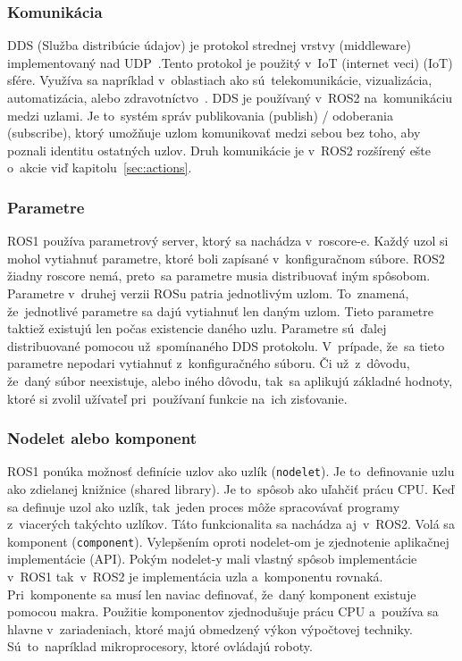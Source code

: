 \subsubsection{Komunikácia}

	DDS (Služba distribúcie údajov) je protokol strednej vrstvy (middleware) implementovaný nad
	UDP~\cite{ROS2book}.Tento protokol je použitý v~IoT (internet veci) (\acrlong{IoT}) sfére.
	Využíva sa napríklad v~oblastiach ako sú~telekomunikácie, vizualizácia, automatizácia, alebo
	zdravotníctvo~\cite{siteTrend}. DDS je používaný v~ROS2 na~komunikáciu medzi uzlami.
	Je to~systém správ publikovania (publish) / odoberania (subscribe), ktorý umožňuje uzlom
	komunikovať medzi sebou bez toho, aby poznali identitu ostatných uzlov. Druh komunikácie
	je v~ROS2 rozšírený ešte o~akcie viď kapitolu~\ref{sec:actions}.

\subsubsection{Parametre}

	ROS1 používa parametrový server, ktorý sa nachádza v~roscore-e. Každý uzol si mohol vytiahnuť parametre, ktoré boli zapísané v~konfiguračnom
	súbore. ROS2 žiadny roscore nemá, preto~sa parametre musia distribuovať iným spôsobom. Parametre v~druhej verzii ROSu patria jednotlivým uzlom.
	To~znamená, že~jednotlivé parametre sa dajú vytiahnuť len daným uzlom. Tieto parametre taktiež existujú len počas existencie daného uzlu. Parametre
	sú~ďalej distribuované pomocou už~spomínaného DDS protokolu. V~prípade, že~sa tieto parametre nepodari vytiahnuť z~konfiguračného súboru. Či už~z~dôvodu,
	že~daný súbor neexistuje, alebo iného dôvodu, tak~sa aplikujú základné hodnoty, ktoré si zvolil užívateľ pri~používaní funkcie na~ich zisťovanie.

\subsubsection{Nodelet alebo komponent}

	ROS1 ponúka možnosť definície uzlov ako uzlík (\texttt{nodelet}). Je to~definovanie uzlu ako zdielanej knižnice (shared library). Je
	to~spôsob ako uľahčiť prácu CPU. Keď sa definuje uzol ako uzlík, tak~jeden proces môže spracovávať programy z~viacerých takýchto uzlíkov.
	Táto funkcionalita sa nachádza aj~v~ROS2. Volá sa komponent (\texttt{component}). Vylepšením oproti nodelet-om je zjednotenie aplikačnej
	implementácie (API). Pokým nodelet-y mali vlastný spôsob implementácie v~ROS1 tak~v~ROS2 je implementácia uzla a~komponentu rovnaká.
	Pri~komponente sa musí len naviac definovať, že~daný komponent existuje pomocou makra. Použitie komponentov zjednodušuje prácu CPU
	a~používa sa hlavne v~zariadeniach, ktoré majú obmedzený výkon výpočtovej techniky. Sú~to~napríklad mikroprocesory, ktoré ovládajú roboty.

